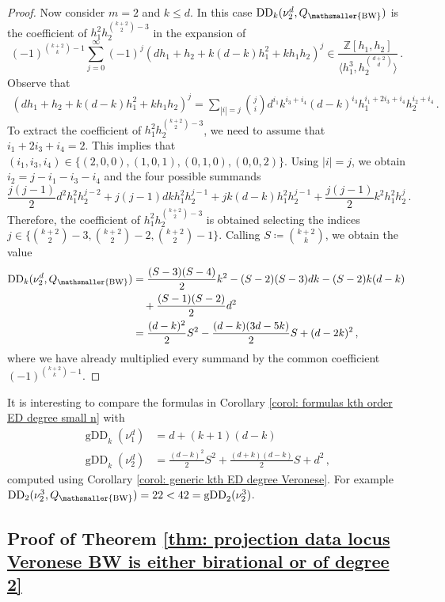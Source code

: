 \documentclass[11pt,reqno]{amsart}
\numberwithin{equation}{section}
\theoremstyle{plain}
\numberwithin{theorem}{section}
\theoremstyle{definition}
\newcommand{\Z}{\mathbb{Z}}
\newcommand{\DD}{\operatorname{DD}}
\newcommand{\gDD}{\operatorname{gDD}}
\newcommand{\mBW}{\mathsmaller{\mathrm{BW}}}
\begin{document}
\begin{proof}
Now consider $m=2$ and $k\le d$. In this case $\DD_k(\nu_2^d,Q_\mBW)$ is the coefficient of $h_1^2h_2^{\binom{k+2}{2}-3}$ in the expansion of
\begin{equation}
	(-1)^{\binom{k+2}{k}-1}\sum_{j=0}^\infty(-1)^j(dh_1+h_2+k(d-k)h_1^2+kh_1h_2)^j \in \frac{\Z[h_1,h_2]}{\langle h_1^3,h_2^{\binom{d+2}{d}}\rangle}\,.
\end{equation}
Observe that
\begin{align*}
	(dh_1+h_2+k(d-k)h_1^2+kh_1h_2)^j = \sum_{|i|=j}\binom{j}{i}d^{i_1}k^{i_3+i_4}(d-k)^{i_3}h_1^{i_1+2i_3+i_4}h_2^{i_2+i_4}\,.
\end{align*}
To extract the coefficient of $h_1^2h_2^{\binom{k+2}{2}-3}$, we need to assume that $i_1+2i_3+i_4=2$. This implies that $(i_1,i_3,i_4)\in\{(2,0,0),(1,0,1),(0,1,0),(0,0,2)\}$. Using $|i|=j$, we obtain $i_2=j-i_1-i_3-i_4$ and the four possible summands
\[
\frac{j(j-1)}{2}d^2h_1^2h_2^{j-2}+j(j-1)dkh_1^2h_2^{j-1}+jk(d-k)h_1^2h_2^{j-1}+\frac{j(j-1)}{2}k^2h_1^2h_2^{j}\,.
\]
Therefore, the coefficient of $h_1^2h_2^{\binom{k+2}{2}-3}$ is obtained selecting the indices $j\in\{\binom{k+2}{2}-3,\binom{k+2}{2}-2,\binom{k+2}{2}-1\}$. Calling $S\coloneqq \binom{k+2}{k}$, we obtain the value
\begin{align}\label{eq: formula EDD k Veronese PP2}
\begin{split}
\DD_k(\nu_2^d,Q_\mBW) &= \frac{(S-3)(S-4)}{2}k^2-(S-2)(S-3)dk-(S-2)k(d-k)\\
&\quad+\frac{(S-1)(S-2)}{2}d^2\\
&= \frac{(d-k)^2}{2}S^2-\frac{(d-k)(3d-5k)}{2}S+(d-2k)^2\,,
\end{split}
\end{align}
where we have already multiplied every summand by the common coefficient $(-1)^{\binom{k+2}{k}-1}$.
\end{proof}

It is interesting to compare the formulas in Corollary \ref{corol: formulas kth order ED degree small n} with
\begin{align*}
    \gDD_k(\nu_1^d) &= d+(k+1)(d-k)\\
    \gDD_k(\nu_2^d) &= \frac{(d-k)^2}{2}S^2+\frac{(d+k)(d-k)}{2}S+d^2\,,
\end{align*}
computed using Corollary \ref{corol: generic kth ED degree Veronese}. For example $\DD_2(\nu_2^3,Q_\mBW)=22<42=\gDD_2(\nu_2^3)$.


\subsection{Proof of Theorem \ref{thm: projection data locus Veronese BW is either birational or of degree 2}}\label{proof4}
\end{document}
